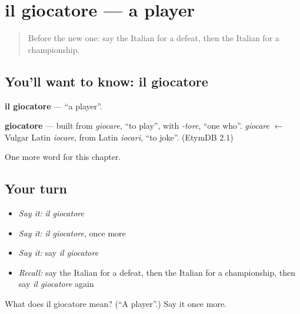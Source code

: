 \section[il giocatore]{il giocatore — a player}

\label{lesson:IT-C231-giocatore}



\begin{quote}
Before the new one: say the Italian for a defeat, then the Italian for a championship.
\end{quote}

\subsection*{You'll want to know: il giocatore}
\textbf{il giocatore} — \textquotedblleft{}a player\textquotedblright{}.

\begin{cousinweb}
\textbf{giocatore} — built from \emph{giocare}, \textquotedblleft{}to play\textquotedblright{}, with \emph{-tore}, \textquotedblleft{}one who\textquotedblright{}. \emph{giocare} $\leftarrow$ Vulgar Latin \emph{iocare}, from Latin \emph{iocari}, \textquotedblleft{}to joke\textquotedblright{}. (EtymDB 2.1)
\end{cousinweb}

\begin{grammarlens}[title={What you've built}]
One more word for this chapter.
\end{grammarlens}

\subsection*{Your turn}
\begin{itemize}
\raggedright
  \item \emph{Say it:} \emph{il giocatore}
  \item \emph{Say it:} \emph{il giocatore}, once more
  \item \emph{Say it:} say \emph{il giocatore}
  \item \emph{Recall:} say the Italian for a defeat, then the Italian for a championship, then say \emph{il giocatore} again
\end{itemize}

\begin{tcolorbox}[breakable,colback=teal!4,colframe=teal!35!black,title={Before you move on}]
What does il giocatore mean? (\textquotedblleft{}A player\textquotedblright{}.) Say it once more.
\end{tcolorbox}
